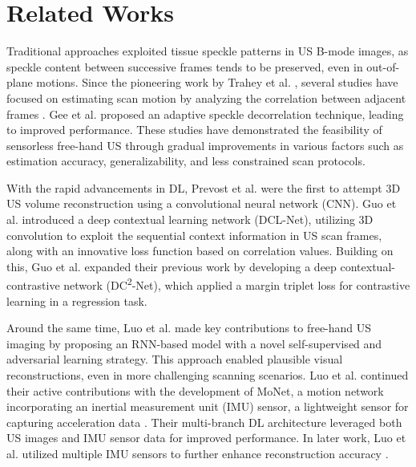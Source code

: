\section{Related Works}
\label{sec:Related_Works}

Traditional approaches exploited tissue speckle patterns in US B-mode images, 
as speckle content between successive frames tends to be preserved, 
even in out-of-plane  motions. 
Since the pioneering work by Trahey et al. \cite{trahey_1986_SD_0}, 
several studies have focused on estimating scan motion by analyzing the correlation 
between adjacent frames \cite{chen_1997_SD_1, tuthill_1998_SD_2}. 
Gee et al. \cite{gee_2006_SD_3} proposed an adaptive speckle decorrelation technique, 
leading to improved performance. 
These studies have demonstrated the feasibility of sensorless free-hand US 
through gradual improvements in various factors such as estimation accuracy, 
generalizability, and less constrained scan protocols.

With the rapid advancements in DL, 
Prevost et al. \cite{prevost_2018_CNN} were the first to attempt 3D US volume reconstruction 
using a convolutional neural network (CNN).
Guo et al. \cite{guo_2020_DCL} introduced a deep contextual learning network (DCL-Net), 
utilizing 3D convolution to exploit the sequential context information in US scan frames, 
along with an innovative loss function based on correlation values. 
Building on this, Guo et al. \cite{guo_2022_DC2} expanded their previous work 
by developing a deep contextual-contrastive network (DC\textsuperscript{2}-Net), 
which applied a margin triplet loss for contrastive learning in a regression task.

Around the same time, 
Luo et al. \cite{luo_2021_LSTM} made key contributions to free-hand US imaging 
by proposing an RNN-based model with a novel self-supervised and adversarial learning strategy. 
This approach enabled plausible visual reconstructions, 
even in more challenging scanning scenarios. 
Luo et al. continued their active contributions with the development of MoNet, 
a motion network incorporating an inertial measurement unit (IMU) sensor, 
a lightweight sensor for capturing acceleration data \cite{luo_2022_MoNet}. 
Their multi-branch DL architecture leveraged both US images and IMU sensor data for improved performance. 
In later work, Luo et al. utilized multiple IMU sensors to further enhance reconstruction accuracy \cite{luo_2023_OSCNet}.

